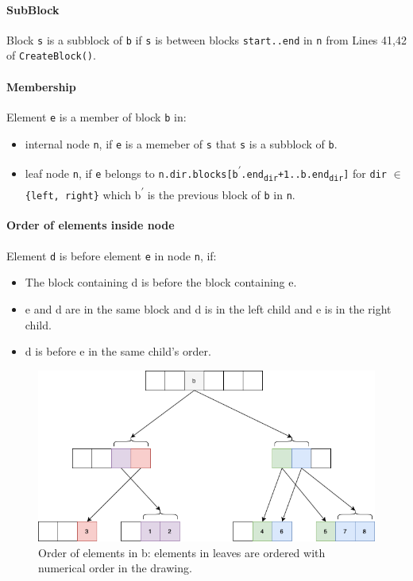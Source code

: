 \documentclass[10pt]{article}
\theoremstyle{definition}
\begin{document}
\paragraph{SubBlock} Block \texttt{s} is a subblock of \texttt{b} if \texttt{s} is between blocks \texttt{start..end} in \texttt{n} from Lines 41,42 of \texttt{CreateBlock()}.

\paragraph{Membership}
Element \texttt{e} is a member of block \texttt{b} in:
\begin{itemize}
  \item internal node \texttt{n}, if \texttt{e} is a memeber of \texttt{s} that \texttt{s} is a subblock of \texttt{b}.
  \item leaf node \texttt{n}, if \texttt{e} belongs to \texttt{n.dir.blocks[b\textsuperscript{$\prime$}.end\textsubscript{dir}+1..b.end\textsubscript{dir}]} for \texttt{dir} $\in$ \texttt{\{left, right\}} which b\textsuperscript{$\prime$} is the previous block of \texttt{b} in \texttt{n}.
\end{itemize}


\pagebreak
\paragraph{Order of elements inside node}
Element \texttt{d} is before element \texttt{e} in node \texttt{n}, if:
\begin{itemize}
  \item The block containing d is before the block containing e.
  \item e and d are in the same block and d is in the left child and e is in the right child.
  \item d is before e in the same child's order.
\end{itemize}


\begin{figure}[hbt]
  \center\includegraphics[width=5.5in]{pics/tree}
  \caption{Order of elements in b: elements in leaves are ordered with numerical order in the drawing.}
\end{figure}
\end{document}
